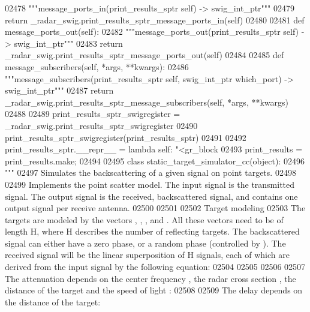\begin{DoxyCode}
{{{{{{{{{02478         \textcolor{stringliteral}{"""message\_ports\_in(print\_results\_sptr self) -> swig\_int\_ptr"""}
02479         \textcolor{keywordflow}{return} \_radar\_swig.print\_results\_sptr\_message\_ports\_in(self)
02480 
02481     \textcolor{keyword}{def }message_ports_out(self):
02482         \textcolor{stringliteral}{"""message\_ports\_out(print\_results\_sptr self) -> swig\_int\_ptr"""}
02483         \textcolor{keywordflow}{return} \_radar\_swig.print\_results\_sptr\_message\_ports\_out(self)
02484 
02485     \textcolor{keyword}{def }message_subscribers(self, *args, **kwargs):
02486         \textcolor{stringliteral}{"""message\_subscribers(print\_results\_sptr self, swig\_int\_ptr which\_port) -> swig\_int\_ptr"""}
02487         \textcolor{keywordflow}{return} \_radar\_swig.print\_results\_sptr\_message\_subscribers(self, *args, **kwargs)
02488 
02489 print\_results\_sptr\_swigregister = \_radar\_swig.print\_results\_sptr\_swigregister
02490 print_results_sptr_swigregister(print\_results\_sptr)
02491 
02492 print\_results\_sptr.\_\_repr\_\_ = \textcolor{keyword}{lambda} self: \textcolor{stringliteral}{"<gr\_block %
02493 print\_results = print\_results.make;
02494 
02495 \textcolor{keyword}{class }static_target_simulator_cc(object):
02496     \textcolor{stringliteral}{"""}
02497 \textcolor{stringliteral}{    Simulates the backscattering of a given signal on point targets.}
02498 \textcolor{stringliteral}{}
02499 \textcolor{stringliteral}{    Implements the point scatter model. The input signal is the transmitted signal. The output signal is
       the received, backscattered signal, and contains one output signal per receive antenna.}
02500 \textcolor{stringliteral}{}
02501 \textcolor{stringliteral}{}
02502 \textcolor{stringliteral}{    Target modeling}
02503 \textcolor{stringliteral}{    The targets are modeled by the vectors , , , and . All these vectors need to be of length H, where H
       describes the number of reflecting targets. The backscattered signal can either have a zero phase, or a random
       phase (controlled by ). The received signal will be the linear superposition of H signals, each of which
       are derived from the input signal by the following equation:}
02504 \textcolor{stringliteral}{}
02505 \textcolor{stringliteral}{}
02506 \textcolor{stringliteral}{}
02507 \textcolor{stringliteral}{    The attenuation depends on the center frequency , the radar cross section , the distance of the target 
       and the speed of light : }
02508 \textcolor{stringliteral}{}
02509 \textcolor{stringliteral}{    The delay  depends on the distance of the target: }
}}}}}}}}}}
\end{DoxyCode}
